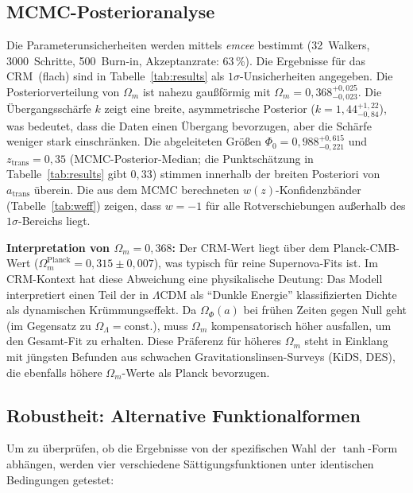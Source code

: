 \documentclass[aps,prd,twocolumn,superscriptaddress,nofootinbib]{revtex4-2}
\begin{document}
\subsection{MCMC-Posterioranalyse}
\label{subsec:mcmc}

Die Parameterunsicherheiten werden mittels \textit{emcee} \cite{ForemanMackey2013} bestimmt (32~Walkers, 3000~Schritte, 500~Burn-in, Akzeptanzrate: 63\,\%). Die Ergebnisse f\"ur das CRM~(flach) sind in Tabelle~\ref{tab:results} als $1\sigma$-Unsicherheiten angegeben. Die Posteriorverteilung von $\Omega_m$ ist nahezu gau\ss{}f\"ormig mit $\Omega_m = 0{,}368^{+0{,}025}_{-0{,}023}$. Die \"Ubergangssch\"arfe $k$ zeigt eine breite, asymmetrische Posterior ($k = 1{,}44^{+1{,}22}_{-0{,}84}$), was bedeutet, dass die Daten einen \"Ubergang bevorzugen, aber die Sch\"arfe weniger stark einschr\"anken. Die abgeleiteten Gr\"o\ss{}en $\Phi_0 = 0{,}988^{+0{,}615}_{-0{,}221}$ und $z_{\mathrm{trans}} = 0{,}35$ (MCMC-Posterior-Median; die Punktsch\"atzung in Tabelle~\ref{tab:results} gibt $0{,}33$) stimmen innerhalb der breiten Posteriori von $a_{\mathrm{trans}}$ \"uberein. Die aus dem MCMC berechneten $w(z)$-Konfidenzb\"ander (Tabelle~\ref{tab:weff}) zeigen, dass $w = -1$ f\"ur alle Rotverschiebungen au\ss{}erhalb des $1\sigma$-Bereichs liegt.

\textbf{Interpretation von $\Omega_m = 0{,}368$:} Der CRM-Wert liegt \"uber dem Planck-CMB-Wert ($\Omega_m^{\mathrm{Planck}} = 0{,}315 \pm 0{,}007$), was typisch f\"ur reine Supernova-Fits ist. Im CRM-Kontext hat diese Abweichung eine physikalische Deutung: Das Modell interpretiert einen Teil der in $\Lambda$CDM als ``Dunkle Energie'' klassifizierten Dichte als dynamischen Kr\"ummungseffekt. Da $\Omega_\Phi(a)$ bei fr\"uhen Zeiten gegen Null geht (im Gegensatz zu $\Omega_\Lambda = \mathrm{const.}$), muss $\Omega_m$ kompensatorisch h\"oher ausfallen, um den Gesamt-Fit zu erhalten. Diese Pr\"aferenz f\"ur h\"oheres $\Omega_m$ steht in Einklang mit j\"ungsten Befunden aus schwachen Gravitationslinsen-Surveys (KiDS, DES), die ebenfalls h\"ohere $\Omega_m$-Werte als Planck bevorzugen.

\subsection{Robustheit: Alternative Funktionalformen}
\label{subsec:funktionalformen}

Um zu \"uberpr\"ufen, ob die Ergebnisse von der spezifischen Wahl der $\tanh$-Form abh\"angen, werden vier verschiedene S\"attigungsfunktionen unter identischen Bedingungen getestet:
\end{document}
